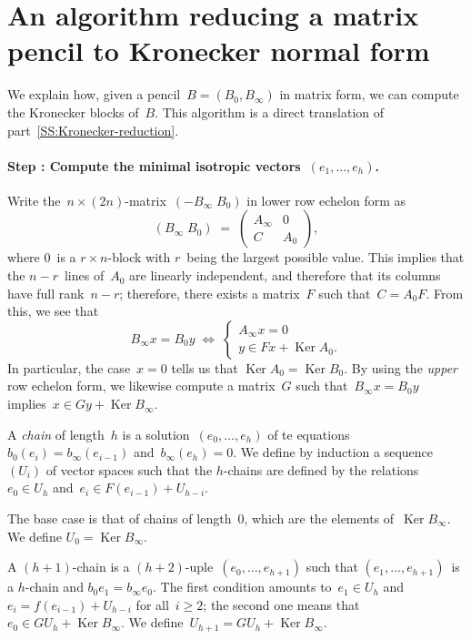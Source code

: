 \documentclass{lms}%
\newif\ifappendix \appendixtrue
\def\mat#1{\begin{pmatrix}#1\end{pmatrix}}
\DeclareMathOperator\Ker{Ker}
\begin{document}



\ifappendix
\appendix
\section{An algorithm reducing a matrix pencil to Kronecker normal form}
\label{A:algo}

We explain how, given a pencil~$B = (B_{0}, B_{∞})$ in matrix form, we
can compute the Kronecker blocks of~$B$. This algorithm is a direct
translation of part~\ref{SS:Kronecker-reduction}.
\def\step#1{\paragraph{Step : #1.}}

\step{Compute the minimal isotropic vectors~$(e_1,…,e_h)$}

Write the~$n × (2n)$-matrix~$(-B_{∞} \; B_0)$ in lower row echelon form as
\begin{equation}
(B_{∞} \; B_0) \;=\; \mat{A_{∞} & 0\\ C & A_0},
\end{equation}
where $0$~is a $r × n$-block with $r$~being the largest possible value.
This implies that the $n-r$~lines of~$A_0$ are linearly independent, and
therefore that its columns have full rank~$n-r$; therefore, there exists
a matrix~$F$ such that~$C = A_0 F$. From this, we see that
\begin{equation}
B_{∞} x = B_0 y \;⇔ \; \begin{cases} A_{∞} x = 0\\ y ∈ Fx + \Ker A_0.
\end{cases}
\end{equation}
In particular, the case~$x = 0$ tells us that $\Ker A_0 = \Ker B_0$. By
using the \emph{upper} row echelon form, we likewise compute a matrix~$G$
such that~$B_{∞} x = B_0 y$ implies~$x ∈ G y + \Ker B_{∞}$.

A \emph{chain} of length~$h$ is a solution~$(e_0,…,e_h)$ of te
equations~$b_0(e_i) = b_{∞}(e_{i-1})$ and~$b_{∞}(e_h) = 0$.
We define by induction a sequence~$(U_i)$ of vector spaces such that the
$h$-chains are defined by the relations~$e_0 ∈ U_h$ and~$e_i ∈ F(e_{i-1})
+ U_{h-i}$.

The base case is that of chains of length~$0$, which are the
elements of~$\Ker B_{∞}$. We define $U_0 = \Ker B_{∞}$.

A $(h+1)$-chain is a $(h+2)$-uple~$(e_0,…,e_{h+1})$ such that
$(e_1,…,e_{h+1})$~is a $h$-chain and $b_{0} e_1 = b_{∞} e_0$.
The first condition amounts to~$e_1 ∈ U_h$ and~$e_i = f(e_{i-1}) +
U_{h-i}$ for all~$i ≥ 2$; the second one means that $e_0 ∈ G U_{h} + \Ker
B_{∞}$. We define~$U_{h+1} = G U_h + \Ker B_{∞}$.
\end{document}
